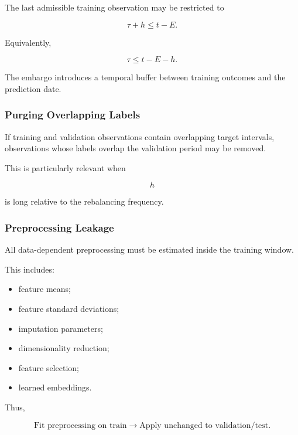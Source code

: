\documentclass[11pt,a4paper]{article}
\begin{document}
The last admissible training observation may be restricted to

\begin{equation}
\boxed{
\tau+h
\leq
t-E.
}
\end{equation}

Equivalently,

\begin{equation}
\tau
\leq
t-E-h.
\end{equation}

The embargo introduces a temporal buffer between training outcomes and the
prediction date.


\subsubsection{Purging Overlapping Labels}

If training and validation observations contain overlapping target intervals,
observations whose labels overlap the validation period may be removed.

This is particularly relevant when

\begin{equation}
h
\end{equation}

is long relative to the rebalancing frequency.


\subsubsection{Preprocessing Leakage}

All data-dependent preprocessing must be estimated inside the training window.

This includes:

\begin{itemize}
    \item feature means;
    \item feature standard deviations;
    \item imputation parameters;
    \item dimensionality reduction;
    \item feature selection;
    \item learned embeddings.
\end{itemize}

Thus,

\begin{equation}
\boxed{
\text{Fit preprocessing on train}
\rightarrow
\text{Apply unchanged to validation/test}.
}
\end{equation}
\end{document}
